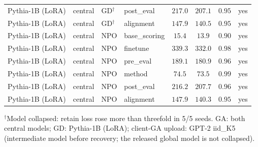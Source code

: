 \begin{table}[t]
\begin{tabular*}{\textwidth}{@{\extracolsep{\fill}}llllcccc@{}}
Pythia-1B (LoRA) & central & GD$^{\dagger}$ & post\_eval & $217.0$ & $207.1$ & $0.95$ & yes \\
Pythia-1B (LoRA) & central & GD$^{\dagger}$ & alignment & $147.9$ & $140.5$ & $0.95$ & yes \\
Pythia-1B (LoRA) & central & NPO & base\_scoring & $15.4$ & $13.9$ & $0.90$ & yes \\
Pythia-1B (LoRA) & central & NPO & finetune & $339.3$ & $332.0$ & $0.98$ & yes \\
Pythia-1B (LoRA) & central & NPO & pre\_eval & $189.1$ & $180.9$ & $0.96$ & yes \\
Pythia-1B (LoRA) & central & NPO & method & $74.5$ & $73.5$ & $0.99$ & yes \\
Pythia-1B (LoRA) & central & NPO & post\_eval & $216.2$ & $207.7$ & $0.96$ & yes \\
Pythia-1B (LoRA) & central & NPO & alignment & $147.9$ & $140.3$ & $0.95$ & yes \\
\bottomrule
\end{tabular*}

\smallskip
{\footnotesize $^{\dagger}$Model collapsed: retain loss rose more than threefold in 5/5 seeds. GA: both central models; GD: Pythia-1B (LoRA); client-GA upload: GPT-2 iid\_K5 (intermediate model before recovery; the released global model is not collapsed).\par}
\end{table}
